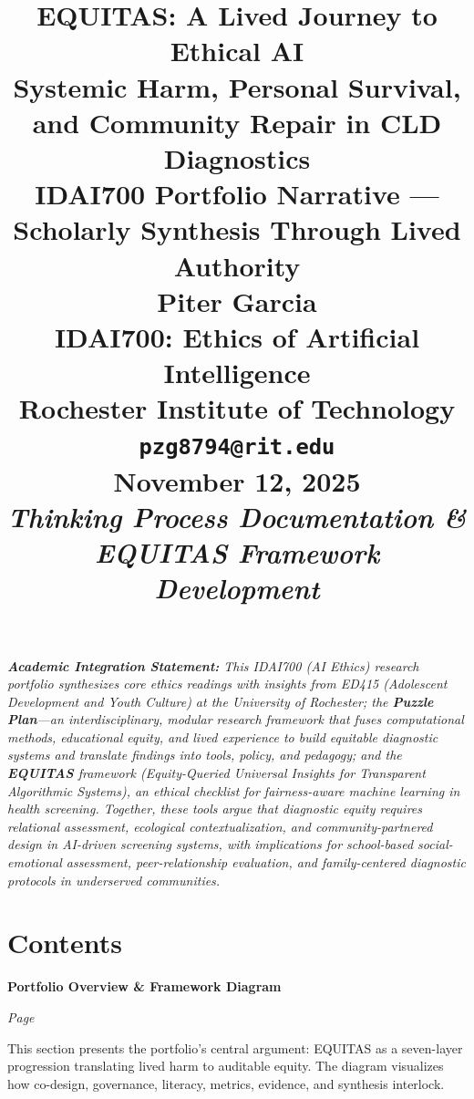\documentclass[11pt,twoside]{article}
\title{
\vspace*{1.5in}
\textbf{\Huge EQUITAS: A Lived Journey to Ethical AI}\\[0.5em]
\Large Systemic Harm, Personal Survival, and Community Repair in CLD Diagnostics\\[1.5em]
\large IDAI700 Portfolio Narrative --- Scholarly Synthesis Through Lived Authority\\[2em]
\vfill
\Large \textbf{Piter Garcia}\\
\normalsize IDAI700: Ethics of Artificial Intelligence\\
Rochester Institute of Technology\\
\texttt{pzg8794@rit.edu}\\[1em]
\large \textbf{November 12, 2025}\\
\normalsize \textit{Thinking Process Documentation \& EQUITAS Framework Development}
}
\author{}
\date{}
\begin{document}
\thispagestyle{empty}

\maketitle

\vspace{0.5in}

\noindent\textit{\tiny\textbf{Academic Integration Statement:}
This IDAI700 (AI Ethics) research portfolio synthesizes core ethics readings with insights from ED415 (Adolescent Development and Youth Culture) at the University of Rochester; the \textbf{Puzzle Plan}---an interdisciplinary, modular research framework that fuses computational methods, educational equity, and lived experience to build equitable diagnostic systems and translate findings into tools, policy, and pedagogy; and the \textbf{EQUITAS} framework (Equity-Queried Universal Insights for Transparent Algorithmic Systems), an ethical checklist for fairness-aware machine learning in health screening. Together, these tools argue that \emph{diagnostic equity requires relational assessment, ecological contextualization, and community-partnered design} in AI-driven screening systems, with implications for school-based social-emotional assessment, peer-relationship evaluation, and family-centered diagnostic protocols in underserved communities.}

\newpage


\thispagestyle{empty}

\setcounter{page}{2}

\section*{\Large Contents}

\vspace{0.3cm}

\noindent\textbf{\large Portfolio Overview \& Framework Diagram}\hfill

\textit{Page \pageref{sec:overview}}

\vspace{0.2cm}

\noindent This section presents the portfolio's central argument: EQUITAS as a seven-layer progression translating lived harm to auditable equity. The diagram visualizes how co-design, governance, literacy, metrics, evidence, and synthesis interlock.

\vspace{0.5cm}
\end{document}
